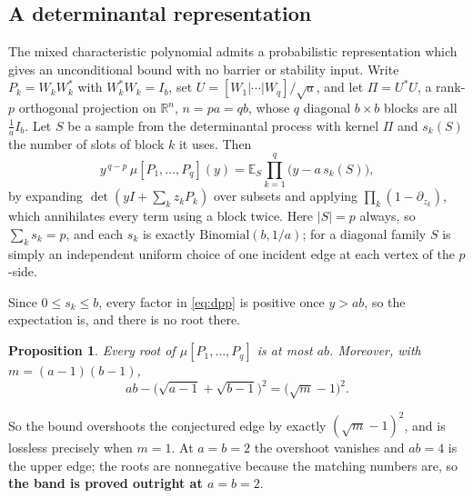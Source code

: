 \documentclass[11pt]{article}
\newtheorem{proposition}[theorem]{Proposition}
\theoremstyle{remark}
\begin{document}
\subsection{A determinantal representation}

The mixed characteristic polynomial admits a probabilistic representation which gives
an unconditional bound with no barrier or stability input. Write $P_k=W_kW_k^{*}$
with $W_k^{*}W_k=I_b$, set $U=[W_1|\cdots|W_q]/\sqrt a$, and let $\Pi=U^{*}U$, a
rank-$p$ orthogonal projection on $\mathbb R^{n}$, $n=pa=qb$, whose $q$ diagonal
$b\times b$ blocks are all $\tfrac1aI_b$. Let $S$ be a sample from the determinantal
process with kernel $\Pi$ and $s_k(S)$ the number of slots of block $k$ it uses.
Then
\begin{equation}\label{eq:dpp}
y^{\,q-p}\,\mu[P_1,\dots,P_q](y)=\mathbb E_S\prod_{k=1}^q\bigl(y-a\,s_k(S)\bigr),
\end{equation}
by expanding $\det(yI+\sum_kz_kP_k)$ over subsets and applying
$\prod_k(1-\partial_{z_k})$, which annihilates every term using a block twice. Here
$|S|=p$ always, so $\sum_ks_k=p$, and each $s_k$ is exactly
$\mathrm{Binomial}(b,1/a)$; for a diagonal family $S$ is simply an independent
uniform choice of one incident edge at each vertex of the $p$-side.

Since $0\le s_k\le b$, every factor in \eqref{eq:dpp} is positive once $y>ab$, so
the expectation is, and there is no root there.

\begin{proposition}\label{prop:abbound}
Every root of $\mu[P_1,\dots,P_q]$ is at most $ab$. Moreover, with
$m=(a-1)(b-1)$,
\[
ab-\bigl(\sqrt{a-1}+\sqrt{b-1}\bigr)^2=\bigl(\sqrt m-1\bigr)^2 .
\]
\end{proposition}

So the bound overshoots the conjectured edge by exactly $(\sqrt m-1)^2$, and is
lossless precisely when $m=1$. At $a=b=2$ the overshoot vanishes
and $ab=4$ is the upper edge; the roots are nonnegative because the matching numbers
are, so \textbf{the band is proved outright at $a=b=2$}.
\end{document}
